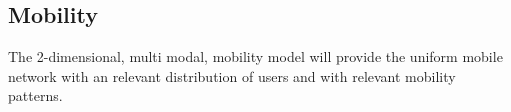 \subsection{Mobility}
The 2-dimensional, multi modal, mobility model \cite{bettstetter2001smooth} will provide the uniform mobile network with an relevant distribution of users and with relevant mobility patterns.
